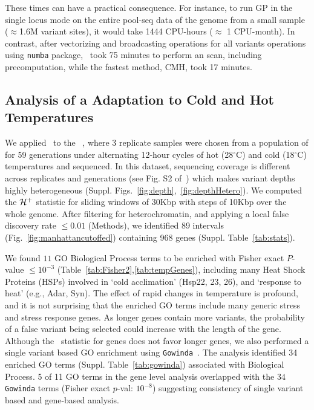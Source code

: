 These times can have a practical consequence. For instance, to run GP
in the single locus mode on the entire pool-seq data of the \dmel genome from a
small sample ($\approx$1.6M variant sites), it would take 1444 CPU-hours
($\approx$ 1 CPU-month). In contrast, after vectorizing and
broadcasting operations for all variants operations using
\texttt{numba} package, \comale\ took 75 minutes to perform an
scan, including precomputation, while the fastest method, CMH, took 17 minutes.

\subsection{Analysis of a \dmel Adaptation to Cold and Hot 
Temperatures}\label{sec:dmel}
We applied \comale\ to the \datadm~\cite{orozco2012adaptation}, where 3
replicate samples were chosen from a population of \dmel for 59
generations under alternating 12-hour cycles of hot (28$^{\circ}$C)
and cold (18$^{\circ}$C) temperatures and sequenced.  In this dataset,
sequencing coverage is different across replicates and generations
(see Fig. S2 of~\cite{Terhorst2015Multi}) which makes variant depths
highly heterogeneous (Suppl.
Figs.~\ref{fig:depth},~\ref{fig:depthHetero}). We computed the
${\cal H}^{+}$ statistic for sliding windows of 30Kbp with steps of 10Kbp
over the whole genome. After filtering for 
heterochromatin\cite{fiston2010drosophila,comeron2012many}, and
applying a local false discovery rate $\le 0.01$ (Methods), we
identified 89 intervals (Fig.~\ref{fig:manhattancutoffed}) containing
968 genes (Suppl. Table~\ref{tab:stats}).

We found $11$ GO Biological Process terms to be enriched with Fisher
exact $P$-value $\le 10^{-3}$ (Table~\ref{tab:Fisher2},\ref{tab:tempGenes}), 
including
many Heat Shock Proteins (HSPs) involved in `cold acclimation' (Hsp22, 23,
26), and `response to heat' (e.g., Adar, Syn). The effect of rapid
changes in temperature is profound, and it is not surprising that the
enriched GO terms include many generic stress and stress response
genes. As longer genes contain more variants, the probability of a
false variant being selected could increase with the length of the
gene. Although the \comale\ statistic for genes does not favor longer
genes, we also performed a single variant based GO enrichment using
\texttt{Gowinda}~\cite{kofler2012gowinda}. The analysis identified 34
enriched GO terms (Suppl. Table~\ref{tab:gowinda}) associated with Biological 
Process. 5 of 11 GO terms
in the gene level analysis overlapped with the $34$ \texttt{Gowinda}
terms (Fisher exact $p$-val: $10^{-8}$) suggesting consistency of single
variant based and gene-based analysis.